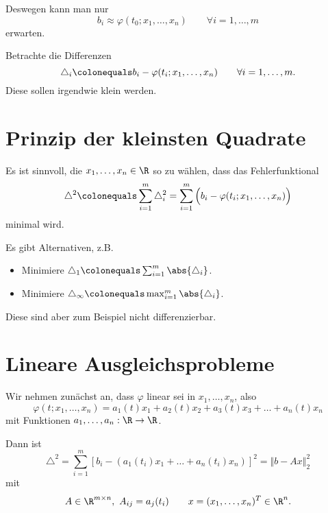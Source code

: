 Deswegen kann man nur
\begin{equation*}
 b_i \approx \varphi(t_0;x_1,\ldots,x_n) \qquad \forall i=1,\ldots,m
\end{equation*}
erwarten.

Betrachte die Differenzen
\begin{equation*}
 \triangle_i\colonequals b_i-\varphi(t_i;x_1,\ldots,x_n) \qquad \forall i=1,\ldots,m.
\end{equation*}
Diese sollen \glqq irgendwie klein\grqq{} werden.


\section{Prinzip der kleinsten Quadrate}
Es ist sinnvoll, die $x_1,\ldots,x_n \in \R$ so zu wählen, dass das Fehlerfunktional
\begin{equation*}
 \triangle^2
 \colonequals
 \sum_{i=1}^m \triangle_i^2
 =
 \sum_{i=1}^m \Big( b_i-\varphi(t_i;x_1,\ldots,x_n) \Big)
\end{equation*} minimal wird.

Es gibt Alternativen, z.B.
\begin{itemize}
 \item Minimiere $\triangle_1 \colonequals \sum_{i=1}^m \abs{ \triangle_i }$.
 \item Minimiere $\triangle_\infty \colonequals \max_{i=1}^m \abs{ \triangle_i }$.
\end{itemize}
Diese sind aber zum Beispiel nicht differenzierbar.

\section{Lineare Ausgleichsprobleme}

Wir nehmen zunächst an, dass $\varphi$ linear sei in $x_1,\ldots,x_n$, also
\begin{equation*}
 \varphi(t;x_1,\ldots,x_n)=a_1(t)x_1+a_2(t)x_2+a_3(t)x_3+\ldots+a_n(t)x_n
\end{equation*}
mit Funktionen $a_1,\dots, a_n : \R \to \R$.

Dann ist
\begin{equation*}
 \triangle^2=\sum_{i=1}^m \left[b_i-(a_1(t_i)x_1+\ldots+a_n(t_i)x_n) \right]^2=\Vert b-Ax \Vert_2^2
\end{equation*}
mit
\begin{equation*}
A \in \R^{m \times n},\ A_{ij}=a_j(t_i)
\qquad
x=(x_1,\ldots,x_n)^T \in \R^n.
\end{equation*}

